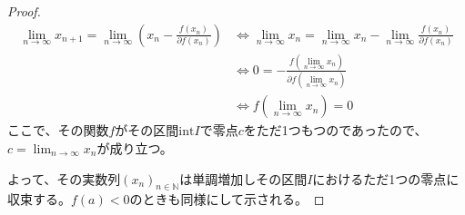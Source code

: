 \documentclass[dvipdfmx]{jsarticle}
\begin{document}
\begin{proof}
\begin{align*}
\lim_{n \rightarrow \infty}x_{n + 1} = \lim_{n \rightarrow \infty}\left( x_{n} - \frac{f\left( x_{n} \right)}{\partial f\left( x_{n} \right)} \right) &\Leftrightarrow \lim_{n \rightarrow \infty}x_{n} = \lim_{n \rightarrow \infty}x_{n} - \lim_{n \rightarrow \infty}\frac{f\left( x_{n} \right)}{\partial f\left( x_{n} \right)}\\
&\Leftrightarrow 0 = - \frac{f\left( \lim_{n \rightarrow \infty}x_{n} \right)}{\partial f\left( \lim_{n \rightarrow \infty}x_{n} \right)}\\
&\Leftrightarrow f\left( \lim_{n \rightarrow \infty}x_{n} \right) = 0
\end{align*}
ここで、その関数$f$がその区間$\mathrm{int}I$で零点$c$をただ1つもつのであったので、$c = \lim_{n \rightarrow \infty}x_{n}$が成り立つ。\par
よって、その実数列$\left( x_{n} \right)_{n \in \mathbb{N}}$は単調増加しその区間$I$におけるただ1つの零点に収束する。$f(a) < 0$のときも同様にして示される。
\end{proof}
\end{document}
